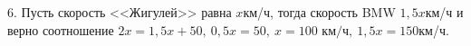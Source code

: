 6. Пусть скорость <<Жигулей>> равна $x$км/ч, тогда скорость BMW $1,5x$км/ч и верно соотношение $2x=1,5x+50,\ 0,5x=50,\ x=100\text{ км/ч},\ 1,5x=150$км/ч.\\
